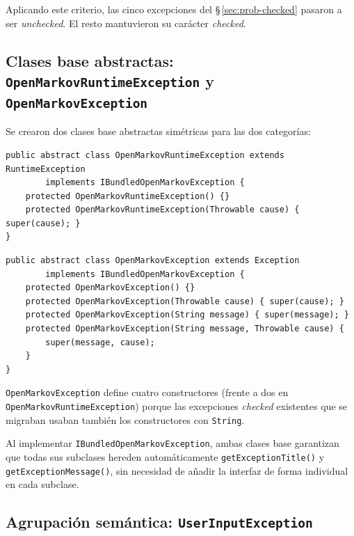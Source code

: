 \documentclass[12pt,a4paper]{article}
\begin{document}
Aplicando este criterio, las cinco excepciones del §\,\ref{sec:prob-checked}
pasaron a ser \emph{unchecked}. El resto mantuvieron su carácter \emph{checked}.

\subsection{Clases base abstractas: \texttt{OpenMarkovRuntimeException} y
  \texttt{OpenMarkovException}}
\label{sec:bases}

Se crearon dos clases base abstractas simétricas para las dos categorías:

\begin{lstlisting}[caption={\texttt{OpenMarkovRuntimeException} — base \textit{unchecked}}]
public abstract class OpenMarkovRuntimeException extends RuntimeException
        implements IBundledOpenMarkovException {
    protected OpenMarkovRuntimeException() {}
    protected OpenMarkovRuntimeException(Throwable cause) { super(cause); }
}
\end{lstlisting}

\begin{lstlisting}[caption={\texttt{OpenMarkovException} — base \textit{checked}}]
public abstract class OpenMarkovException extends Exception
        implements IBundledOpenMarkovException {
    protected OpenMarkovException() {}
    protected OpenMarkovException(Throwable cause) { super(cause); }
    protected OpenMarkovException(String message) { super(message); }
    protected OpenMarkovException(String message, Throwable cause) {
        super(message, cause);
    }
}
\end{lstlisting}

\noindent\texttt{OpenMarkovException} define cuatro constructores (frente a dos
en \texttt{OpenMarkovRuntimeException}) porque las excepciones \emph{checked}
existentes que se migraban usaban también los constructores con \texttt{String}.

Al implementar \texttt{IBundledOpenMarkovException}, ambas clases base garantizan
que todas sus subclases hereden automáticamente
\texttt{getExceptionTitle()} y \texttt{getExceptionMessage()}, sin necesidad de
añadir la interfaz de forma individual en cada subclase.

\subsection{Agrupación semántica: \texttt{UserInputException}}
\label{sec:userinput}
\end{document}
